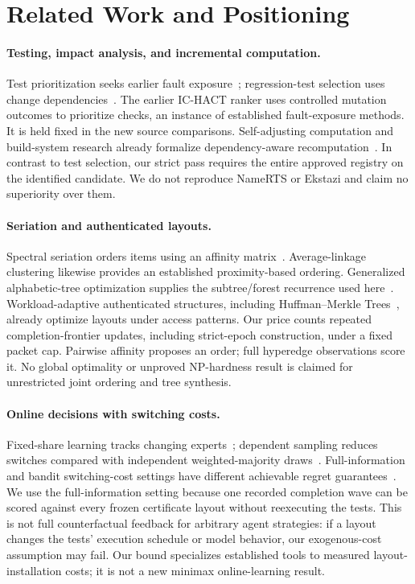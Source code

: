 \documentclass[11pt]{article}
\theoremstyle{definition}\newtheorem{definition}[theorem]{Definition}
\begin{document}
\section{Related Work and Positioning}
\paragraph{Testing, impact analysis, and incremental computation.}
Test prioritization seeks earlier fault exposure~\cite{rothermel}; regression-test selection uses change dependencies~\cite{ekstazi,namerts}. The earlier IC-HACT ranker uses controlled mutation outcomes to prioritize checks, an instance of established fault-exposure methods. It is held fixed in the new source comparisons. Self-adjusting computation and build-system research already formalize dependency-aware recomputation~\cite{acar,build}. In contrast to test selection, our strict pass requires the entire approved registry on the identified candidate. We do not reproduce NameRTS or Ekstazi and claim no superiority over them.

\paragraph{Seriation and authenticated layouts.}
Spectral seriation orders items using an affinity matrix~\cite{atkins}. Average-linkage clustering likewise provides an established proximity-based ordering. Generalized alphabetic-tree optimization supplies the subtree/forest recurrence used here~\cite{alphabetic}. Workload-adaptive authenticated structures, including Huffman--Merkle Trees~\cite{hmt}, already optimize layouts under access patterns. Our price counts repeated completion-frontier updates, including strict-epoch construction, under a fixed packet cap. Pairwise affinity proposes an order; full hyperedge observations score it. No global optimality or unproved NP-hardness result is claimed for unrestricted joint ordering and tree synthesis.

\paragraph{Online decisions with switching costs.}
Fixed-share learning tracks changing experts~\cite{herbster}; dependent sampling reduces switches compared with independent weighted-majority draws~\cite{geulen}. Full-information and bandit switching-cost settings have different achievable regret guarantees~\cite{cesa}. We use the full-information setting because one recorded completion wave can be scored against every frozen certificate layout without reexecuting the tests. This is not full counterfactual feedback for arbitrary agent strategies: if a layout changes the tests' execution schedule or model behavior, our exogenous-cost assumption may fail. Our bound specializes established tools to measured layout-installation costs; it is not a new minimax online-learning result.
\end{document}

